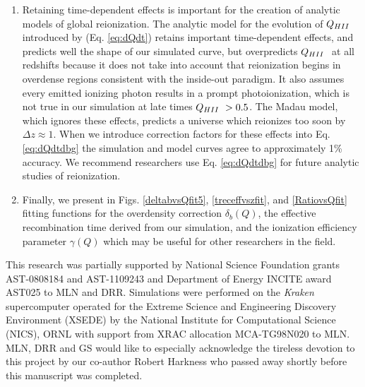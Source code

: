 \begin{enumerate}
\item
Retaining time-dependent effects is important for the creation of analytic models of global reionization. The analytic model for the evolution of $Q_{\hii}$ introduced by \cite{MadauEtAl1999}(Eq. \ref{eq:dQdt}) retains important time-dependent effects, and predicts well the shape of our simulated curve, but overpredicts $Q_{\hii}$ at all redshifts because it does not take into account that reionization begins in overdense regions consistent with the inside-out paradigm. It also assumes every emitted ionizing photon results in a prompt photoionization, which is not true in our simulation at late times $Q_{\hii}>0.5$. The Madau model, which ignores these effects, predicts a universe which reionizes too soon by $\Delta z \approx 1$. When we introduce correction factors for these effects into Eq. \ref{eq:dQdtdbg} the simulation and model curves agree to approximately 1\% accuracy. We recommend researchers use Eq. \ref{eq:dQdtdbg} for future analytic studies of reionization. 
\item
Finally, we present in Figs. \ref{deltabvsQfit5}, \ref{treceffvszfit}, and \ref{RatiovsQfit} fitting functions for the overdensity correction $\delta_b(Q)$, the effective recombination time derived from our simulation, and the ionization efficiency parameter $\gamma(Q)$ which may be useful for other researchers in the field. 
\end{enumerate}

This research was partially supported by National Science Foundation grants AST-0808184 and AST-1109243
and Department of Energy INCITE award AST025 to MLN and DRR. Simulations were performed on the {\em Kraken}
supercomputer operated for the Extreme Science and Engineering Discovery Environment (XSEDE)
by the National Institute for Computational Science (NICS), ORNL with support from XRAC allocation MCA-TG98N020 to MLN.
MLN, DRR and GS would like to especially acknowledge the tireless devotion to this project by our co-author Robert Harkness
who passed away shortly before this manuscript was completed. 



